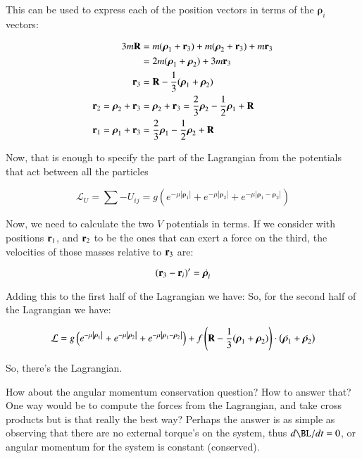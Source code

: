 \documentclass{article}      %
\newcommand{\Brho}[0]{\boldsymbol{\rho}}
\newcommand{\LL}[0]{\mathcal{L}}
\newcommand{\Abs}[1]{\left\lvert{#1}\right\rvert}
\begin{document}
This can be used to express each of the position vectors in terms of the $\Brho_i$ vectors:

\begin{align*}
3 m \BR &= m (\Brho_1 + \Br_3) + m(\Brho_2 + \Br_3) + m \Br_3 \\
        &= 2 m (\Brho_1 + \Brho_2) + 3 m \Br_3 \\
  \Br_3 &= \BR - \inv{3}(\Brho_1 + \Brho_2) \\
\Br_2 = \Brho_2 + \Br_3 &= \Brho_2 + \Br_3 = \frac{2}{3} \Brho_2 - \inv{2} \Brho_1 + \BR \\
\Br_1 = \Brho_1 + \Br_3 &= \frac{2}{3} \Brho_1 - \inv{2} \Brho_2 + \BR \\
\end{align*}

Now, that is enough to specify the part of the Lagrangian from the potentials that act between all the particles

\begin{equation*}
\LL_U = \sum -U_{ij} = g \left( e^{-\mu \Abs{\Brho_1}} + e^{-\mu \Abs{\Brho_2}} + e^{-\mu \Abs{ \Brho_1 - \Brho_2 }} \right)
\end{equation*}

Now, we need to calculate the two $V$ potentials in terms.  If we consider with positions $\mathbf{r}_1$, and $\mathbf{r}_2$ to be the ones
that can exert a force on the third, the velocities of those masses relative to $\mathbf{r}_3$ are:

\begin{equation*}
(\Br_3 - \Br_i)' = \dot{\Brho_i}
\end{equation*}

Adding this to the first half of the Lagrangian we have:
So, for the second half of the Lagrangian we have:

\begin{equation*}
\LL =
g \left( e^{-\mu \Abs{\Brho_1}} + e^{-\mu \Abs{\Brho_2}} + e^{-\mu \Abs{ \Brho_1 - \Brho_2 }} \right)
+ f \left(\BR - \inv{3}(\Brho_1 + \Brho_2) \right) \cdot \left( \dot{\Brho_1} + \dot{\Brho_2} \right)
\end{equation*}

So, there's the Lagrangian.

How about the angular momentum conservation question?  How to answer that?  One way would be to compute the forces from the Lagrangian, and take cross products but is that really the best way?  Perhaps the answer is as simple as observing that there are no external torque's on the system, thus $d\BL/dt = 0$, or angular momentum for the system is constant (conserved).
\end{document}
